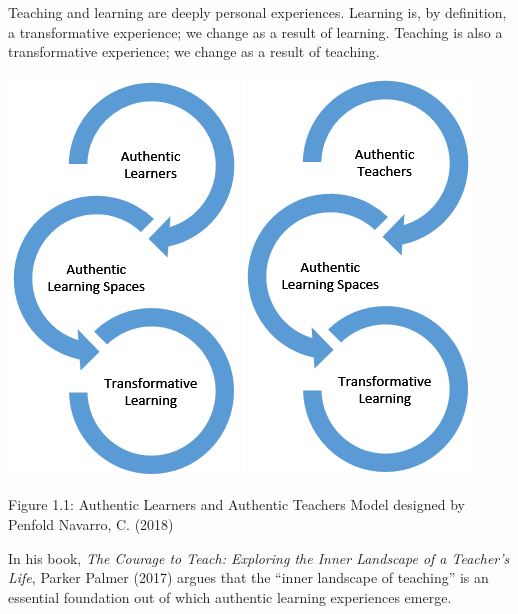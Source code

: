 \documentclass[
]{book}
\begin{document}
Teaching and learning are deeply personal experiences. Learning is, by definition, a transformative experience; we change as a result of learning. Teaching is also a transformative experience; we change as a result of teaching.

\includegraphics{assets/unit1/664-authentic-learners.png} \includegraphics{assets/unit1/664-authentic-teachers.png}

Figure 1.1: Authentic Learners and Authentic Teachers Model designed by Penfold Navarro, C. (2018)

In his book, \emph{The Courage to Teach: Exploring the Inner Landscape of a Teacher's Life}, Parker Palmer (2017) argues that the ``inner landscape of teaching'' is an essential foundation out of which authentic learning experiences emerge.
\end{document}
